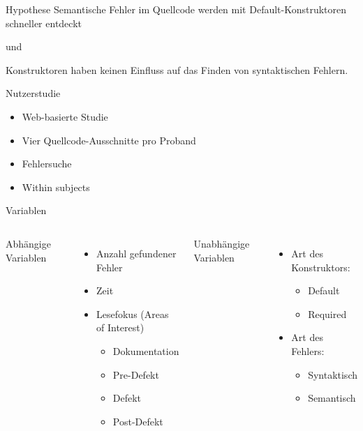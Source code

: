 \documentclass[10pt]{beamer}
\begin{document}
	\begin{frame}[standout]{Hypothese}
		Semantische Fehler im Quellcode werden mit Default-Konstruktoren schneller entdeckt
		\begin{center}\small{und}\end{center}
		Konstruktoren haben keinen Einfluss auf das Finden von syntaktischen Fehlern.
	\end{frame}

	\begin{frame}{Nutzerstudie}
		\begin{itemize}
			\item Web-basierte Studie\\
			\vspace{\baselineskip}
			\item Vier Quellcode-Ausschnitte pro Proband\\
			\vspace{\baselineskip}
			\item Fehlersuche\\
			\vspace{\baselineskip}
			\item Within subjects
		\end{itemize}
	\end{frame}

	\begin{frame}{Variablen}
		\begin{columns}[T,onlytextwidth]
	
			Abhängige Variablen
			\begin{itemize}
				\item Anzahl gefundener Fehler
				\item Zeit
				\item Lesefokus (Areas of Interest)
				\begin{itemize}
					\item Dokumentation
					\item Pre-Defekt
					\item Defekt
					\item Post-Defekt
				\end{itemize}
			\end{itemize}
		
			Unabhängige Variablen
			\begin{itemize}
				\item Art des Konstruktors:
				\begin{itemize}
					\item Default
					\item Required
				\end{itemize}
				\item Art des Fehlers:
				\begin{itemize}
					\item Syntaktisch
					\item Semantisch
				\end{itemize}
			\end{itemize}
		\end{columns}	
	\end{frame}
\end{document}
